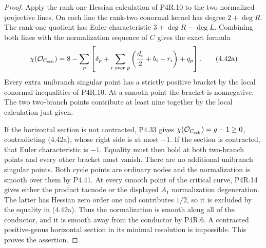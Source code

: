 \begin{proof}
Apply the rank-one Hessian calculation
of P4R.10 to the two normalized projective lines. On each
line the rank-two conormal kernel has degree $2+\deg R$.
The rank-one quotient has Euler characteristic
$3+\deg R-\deg L$. Combining both lines with the
normalization sequence of $C$ gives the exact formula
\[
 \chi(\mathcal O_{C_{\rm sch}})
   =8-\sum_p\left[
       \delta_p+\sum_{i\text{ over }p}
          \left(\frac{d_i}{2}+b_i-r_i\right)+q_p
                 \right].                            \tag{4.42a}
\]
Every extra unibranch singular point has a strictly positive
bracket by the local conormal inequalities of P4R.10.
At a smooth point the bracket is nonnegative. The two
two-branch points contribute at least nine together by the
local calculation just given.

If the horizontal section is not contracted, P4.33 gives
$\chi(\mathcal O_{C_{\rm sch}})=g-1\ge0$, contradicting
(4.42a), whose right side is at most $-1$.
If the section is contracted, that Euler characteristic is
$-1$. Equality must then hold at both two-branch points and every
other bracket must vanish. There are no additional
unibranch singular points. Both cycle points are ordinary
nodes and the normalization is smooth over them by P4.41.
At every smooth point of the
critical curve, P4R.14 gives either the product tacnode
or the displayed $A_1$ normalization degeneration. The
latter has Hessian zero order one and contributes $1/2$,
so it is excluded by the equality in (4.42a). Thus the
normalization is smooth along all of the conductor, and
it is smooth away from the conductor by P4R.6. A contracted
positive-genus horizontal section in its minimal resolution
is impossible. This proves the assertion.
\end{proof}
